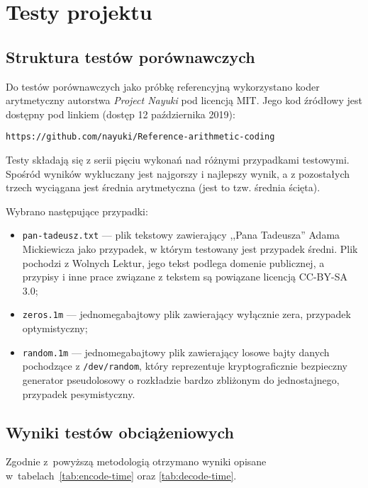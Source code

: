 \documentclass[../../praca.tex]{subfiles}
\begin{document}
\chapter{Testy projektu}

\section{Struktura testów porównawczych}

Do testów porównawczych jako próbkę referencyjną
wykorzystano koder arytmetyczny autorstwa \emph{Project Nayuki}
pod licencją MIT. Jego kod źródłowy jest dostępny pod linkiem (dostęp
12 października 2019):

\begin{center}
\verb|https://github.com/nayuki/Reference-arithmetic-coding|
\end{center}

Testy składają się z serii pięciu wykonań nad różnymi przypadkami
testowymi. Spośród wyników wykluczany jest najgorszy i najlepszy
wynik, a z pozostałych trzech wyciągana jest średnia arytmetyczna
(jest to tzw. średnia ścięta).

Wybrano następujące przypadki:
\begin{itemize}
  \item \texttt{pan-tadeusz.txt} --- plik tekstowy zawierający
    ,,Pana Tadeusza'' Adama Mickiewicza jako przypadek, w którym
    testowany jest przypadek średni. Plik pochodzi z Wolnych Lektur,
    jego tekst podlega domenie publicznej, a przypisy i inne
    prace związane z tekstem są powiązane licencją CC-BY-SA 3.0;
  \item \texttt{zeros.1m} --- jednomegabajtowy plik zawierający
    wyłącznie zera, przypadek optymistyczny;
  \item \texttt{random.1m} --- jednomegabajtowy plik zawierający 
    losowe bajty danych pochodzące z \texttt{/dev/random}, który
    reprezentuje kryptograficznie bezpieczny generator pseudolosowy
    o rozkładzie bardzo zbliżonym do jednostajnego, przypadek
    pesymistyczny.
\end{itemize}

\section{Wyniki testów obciążeniowych}

Zgodnie z~powyższą metodologią otrzymano wyniki opisane 
w~tabelach~\ref{tab:encode-time} oraz \ref{tab:decode-time}.
\end{document}
